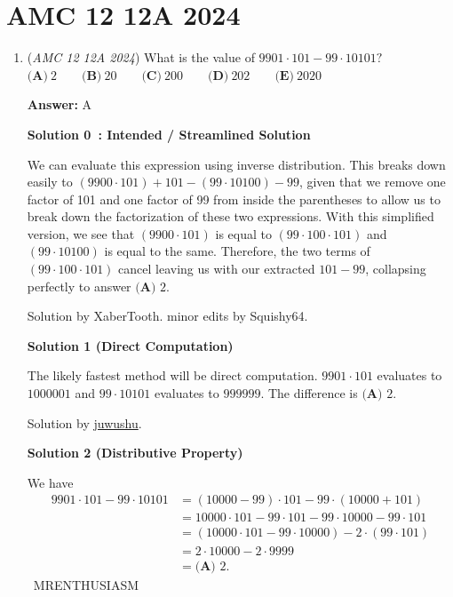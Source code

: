 \section{AMC 12 12A 2024}
        \begin{enumerate}
        	\item (\textit{AMC 12 12A 2024}) What is the value of $9901\cdot101-99\cdot10101?$
$\textbf{(A)}~2\qquad\textbf{(B)}~20\qquad\textbf{(C)}~200\qquad\textbf{(D)}~202\qquad\textbf{(E)}~2020$

 \textbf{Answer: }A



\textbf{Solution 0 : Intended / Streamlined Solution}

We can evaluate this expression using inverse distribution. This breaks down easily to $(9900\cdot101) + 101 - (99\cdot10100) - 99$, given that we remove one factor of 101 and one factor of 99 from inside the parentheses to allow us to break down the factorization of these two expressions. With this simplified version, we see that $(9900\cdot101)$ is equal to $(99\cdot100\cdot101)$ and $(99\cdot10100)$ is equal to the same. Therefore, the two terms of $(99\cdot100\cdot101)$ cancel leaving us with our extracted $101 - 99$, collapsing perfectly to answer $\boxed{\textbf{(A) }2}.$

 Solution by XaberTooth. minor edits by Squishy64.

 



\textbf{Solution 1 (Direct Computation)}

The likely fastest method will be direct computation. $9901\cdot101$ evaluates to $1000001$ and $99\cdot10101$ evaluates to $999999$. The difference is $\boxed{\textbf{(A) }2}.$

 Solution by \href{https://artofproblemsolving.com/wiki/index.php?title=User:Juwushu}{juwushu}.

 



\textbf{Solution 2 (Distributive Property)}

We have
 \begin{align*} 9901\cdot101-99\cdot10101 &= (10000-99)\cdot101-99\cdot(10000+101) \\ &= 10000\cdot101-99\cdot101-99\cdot10000-99\cdot101 \\ &= (10000\cdot101-99\cdot10000)-2\cdot(99\cdot101) \\ &= 2\cdot10000-2\cdot9999 \\ &= \boxed{\textbf{(A) }2}. \end{align*}
~MRENTHUSIASM


\end{enumerate}

